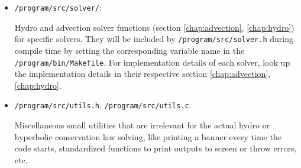 \begin{itemize}
	\item 	\texttt{/program/src/solver/}:
	
			Hydro and advection solver functions (section \ref{chap:advection}, \ref{chap:hydro}) for specific  solvers.
			They will be included by \texttt{/program/src/solver.h} during compile time by setting the corresponding variable name in the \texttt{/program/bin/Makefile}.
			For implementation details of each solver, look up the implementation details in their respective section \ref{chap:advection}, \ref{chap:hydro}.

	\item 	\texttt{/program/src/utils.h}, \texttt{/program/src/utils.c}:
	
			Miscellaneous small utilities that are irrelevant for the actual hydro or hyperbolic conservation law solving, like printing a banner every time the code starts, standardized functions to print outputs to screen or throw errors, etc.

\end{itemize}

	





